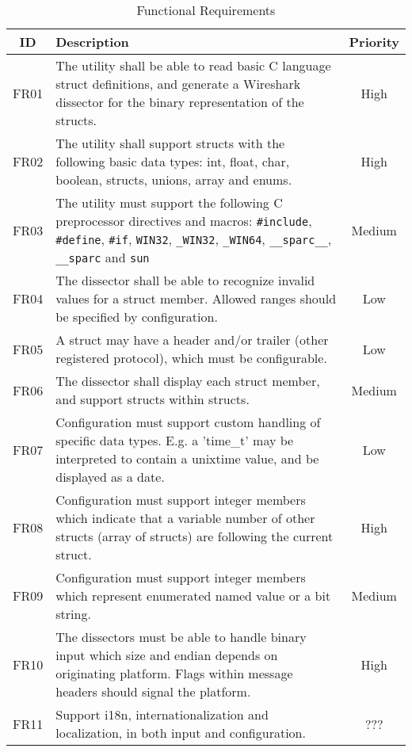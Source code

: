 \begin{table}[ht] \center
\caption{Functional Requirements\label{tab:funcreq}}
\begin{tabular}{| c | p{9cm} | c |}
	\hline ID & Description & Priority \\
    \hline FR01 & The utility shall be able to read basic C language struct
		definitions, and generate a Wireshark dissector for the binary
		representation of the structs. & High \\
	\hline FR02 & The utility shall support structs with the following basic
		data types: int, float, char, boolean, structs, unions, array and
		enums. & High \\
	\hline FR03 & The utility must support the following C preprocessor
		directives and macros: \verb+#include+, \verb+#define+, \verb+#if+,
		\verb+WIN32+, \verb+_WIN32+, \verb+_WIN64+, \verb+__sparc__+,
		\verb+__sparc+ and \verb+sun+ & Medium \\
	\hline FR04 & The dissector shall be able to recognize invalid values for
		a struct member. Allowed ranges should be specified by configuration.
		& Low \\
	\hline FR05 & A struct may have a header and/or trailer (other registered
		protocol), which must be configurable. & Low \\
	\hline FR06 & The dissector shall display each struct member, and support
		structs within structs. & Medium \\
	\hline FR07 & Configuration must support custom handling of
		specific data types. E.g. a 'time\_t' may be interpreted to contain a
		unixtime value, and be displayed as a date. & Low \\
	\hline FR08 & Configuration must support integer members which indicate
		that a variable number of other structs (array of structs) are
		following the current struct. & High \\
	\hline FR09 & Configuration must support integer members which represent
		enumerated named value or a bit string. & Medium \\
	\hline FR10 & The dissectors must be able to handle binary input which size
		and endian depends on originating platform. Flags within message
		headers should signal the platform. & High \\
	\hline FR11 & Support i18n, internationalization and localization, in both
		input and configuration. & ??? \\
	\hline
\end{tabular}
\end{table}

